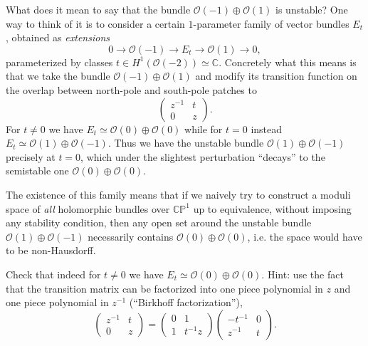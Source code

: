 \documentclass[12pt,letterpaper,reqno]{article}
\numberwithin{equation}{section}
\newcommand{\cO}{\ensuremath{\mathcal O}}
\newcommand{\C}{\ensuremath{\mathbb C}}
\newcommand{\PP}{\ensuremath{\mathbb P}}
\newcommand{\ti}[1]{\textit{#1}}
\begin{document}
\begin{example}[Instability of $\cO(-1) \oplus \cO(1)$]
What does it mean to say that the bundle $\cO(-1) \oplus \cO(1)$
is unstable? One way to think of it is to consider a certain
$1$-parameter family of vector bundles $E_t$, obtained
as \ti{extensions}
\begin{equation}
  0 \to \cO(-1) \to E_t \to \cO(1) \to 0,
\end{equation}
parameterized by classes $t \in H^1(\cO(-2)) \simeq \C$.
Concretely what this means is that we take the bundle
$\cO(-1) \oplus \cO(1)$ and modify its transition function
on the overlap between north-pole and south-pole patches
to
\begin{equation}
  \begin{pmatrix} z^{-1} & t \\ 0 & z \end{pmatrix}.
\end{equation}
For $t \neq 0$ we have $E_t \simeq \cO(0) \oplus \cO(0)$
while for $t = 0$ instead $E_t \simeq \cO(1) \oplus \cO(-1)$.
Thus we have the unstable bundle
$\cO(1) \oplus \cO(-1)$
precisely at $t = 0$, which under the
slightest perturbation ``decays'' to the semistable one
$\cO(0) \oplus \cO(0)$.

The existence of this family
means that if we naively try to construct a moduli space of \ti{all} holomorphic bundles
over $\C\PP^1$ up to equivalence, without imposing any stability condition,
then any open set around the unstable
bundle $\cO(1) \oplus \cO(-1)$ necessarily contains $\cO(0) \oplus \cO(0)$,
i.e. the space would have to be non-Hausdorff.
\end{example}

\begin{exercise}
Check that indeed for $t \neq 0$ we have $E_t \simeq \cO(0) \oplus \cO(0)$.
Hint: use the fact that the transition matrix can be factorized into
one piece polynomial in $z$ and one piece polynomial in $z^{-1}$
(``Birkhoff factorization''),
\begin{equation}
   \begin{pmatrix} z^{-1} & t \\ 0 & z \end{pmatrix} = \begin{pmatrix} 0 & 1 \\ 1 & t^{-1}z \end{pmatrix} \begin{pmatrix} -t^{-1} & 0 \\ z^{-1} & t \end{pmatrix}.
\end{equation}
\end{exercise}
\end{document}
